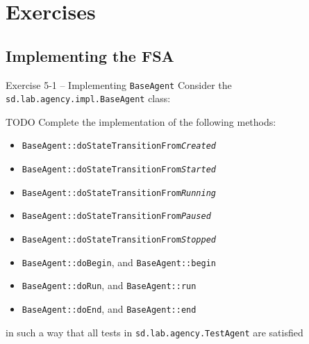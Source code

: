 \documentclass[presentation]{beamer}\mode<presentation>{\usetheme{AMSCesenaPurpleAndGold}}
\begin{document}
\section{Exercises}

\subsection{Implementing the FSA}

\begin{frame}[allowframebreaks]{Exercise 5-1 -- Implementing \texttt{BaseAgent}}
    Consider the \texttt{sd.lab.agency.impl.\alert{BaseAgent}} class:
    

    \framebreak

    \begin{block}{TODO}
        Complete the implementation of the following methods:
        \begin{itemize}
            \item \texttt{BaseAgent::\alert{doStateTransitionFrom\textit{Created}}}

            \item \texttt{BaseAgent::\alert{doStateTransitionFrom\textit{Started}}}

            \item \texttt{BaseAgent::\alert{doStateTransitionFrom\textit{Running}}}

            \item \texttt{BaseAgent::\alert{doStateTransitionFrom\textit{Paused}}}

            \item \texttt{BaseAgent::\alert{doStateTransitionFrom\textit{Stopped}}}

            \item \texttt{BaseAgent::\alert{doBegin}}, and  \texttt{BaseAgent::\alert{begin}}

            \item \texttt{BaseAgent::\alert{doRun}}, and \texttt{BaseAgent::\alert{run}}

            \item \texttt{BaseAgent::\alert{doEnd}}, and \texttt{BaseAgent::\alert{end}}
        \end{itemize}
        in such a way that all tests in \texttt{sd.lab.agency.\alert{TestAgent}} are satisfied
    \end{block}
\end{frame}
\end{document}
